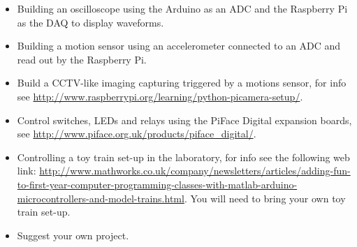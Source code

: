 \begin{itemize}
\item Building an oscilloscope using the Arduino \microcontroller as an ADC and the Raspberry Pi as the DAQ to display waveforms.
\item Building a motion sensor using an accelerometer connected to an ADC and read out by the Raspberry Pi.
\item Build a CCTV-like imaging capturing triggered by a motions sensor, for info see \url{http://www.raspberrypi.org/learning/python-picamera-setup/}.
\item Control switches, LEDs and relays using the PiFace Digital expansion boards, see \url{http://www.piface.org.uk/products/piface_digital/}.
\item Controlling a toy train set-up in the laboratory, for info see the following web link: \url{http://www.mathworks.co.uk/company/newsletters/articles/adding-fun-to-first-year-computer-programming-classes-with-matlab-arduino-microcontrollers-and-model-trains.html}.
You will need to bring your own toy train set-up.
\item Suggest your own project.
\end{itemize}




